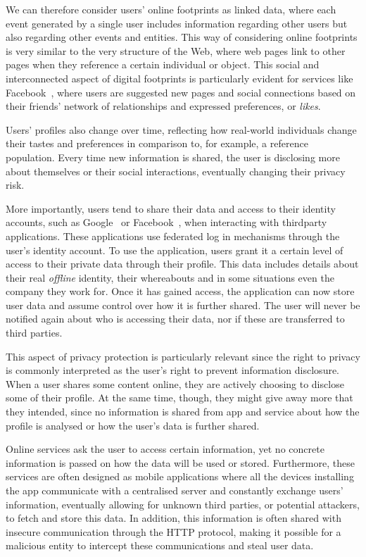 We can therefore consider users' online footprints as linked data, where each event generated by a single user includes information regarding other users but also regarding other events and entities. This way of considering online footprints is very similar to the very structure of the Web, where web pages link to other pages when they reference a certain individual or object. This social and interconnected aspect of digital footprints is particularly evident for services like Facebook~\cite{facebook}, where users are suggested new pages and social connections based on their friends' network of relationships and expressed preferences, or \emph{likes}.

Users' profiles also change over time, reflecting how real-world individuals change their tastes and preferences in comparison to, for example, a reference population. Every time new information is shared, the user is disclosing more about themselves or their social interactions, eventually changing their privacy risk.

More importantly, users tend to share their data and access to their identity accounts, such as Google~\cite{google} or Facebook~\cite{facebook}, when interacting with third\hyph party applications. These applications use federated log in mechanisms through the user's identity account. To use the application, users grant it a certain level of access to their private data through their profile. This data includes details about their real \emph{offline} identity, their whereabouts and in some situations even the company they work for. Once it has gained access, the application can now store user data and assume control over how it is further shared.  The  user  will never be notified again about who is accessing their data, nor if these are transferred to third parties. 

This aspect of privacy protection is particularly relevant since the right to privacy is commonly interpreted as the user's right to prevent information disclosure. When a user shares some content online, they are actively choosing to disclose some of their profile. At the same time, though, they might give away more that they intended, since no information is shared from app and service about how the profile is analysed or how the user's data is further shared. 

Online services ask the user to access certain information, yet no concrete information is passed on how the data will be used or stored. Furthermore, these services are often designed as mobile applications where all the devices installing the  app communicate with a centralised server and constantly exchange users' information, eventually allowing for unknown third parties, or potential attackers, to fetch and store this data. In addition, this information is often shared with insecure communication through the HTTP protocol, making it possible for a malicious entity to intercept these communications and steal user data. 

